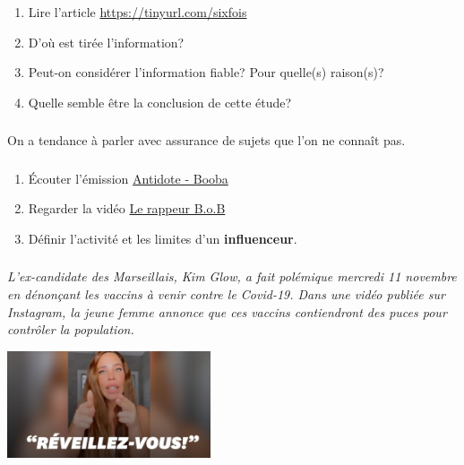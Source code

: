 \documentclass[svgnames,11pt]{beamer}
\begin{document}
\begin{frame}
    \frametitle{}

    \begin{activite}
        \begin{enumerate}
            \item Lire l'article \url{https://tinyurl.com/sixfois}
            \item D'où est tirée l'information?
            \item Peut-on considérer l'information fiable? Pour quelle(s) raison(s)?
            \item Quelle semble être la conclusion de cette étude?
        \end{enumerate}
        \end{activite}

\end{frame}
\begin{frame}
    \frametitle{}

    \begin{aretenir}[Biais 3]
    \centering On a tendance à parler avec assurance de sujets que l'on ne connaît pas.
    \end{aretenir}
\end{frame}
\begin{frame}
    \frametitle{}
\begin{activite}
\begin{enumerate}
    \item Écouter l'émission \href{https://www.franceinter.fr/embed/player/aod/8d4e5c50-df6a-4189-a4a3-3453bf875477}{Antidote - Booba}
    \item Regarder la vidéo \href{https://www.sciencesetavenir.fr/videos/le-rappeur-qui-croyait-que-la-terre-etait-plate-a-definitivement-perdu-la-partie_l3vzx8}{Le rappeur B.o.B}
    \item Définir l'activité et les limites d'un \textbf{influenceur}.
\end{enumerate}
\end{activite}
    

\end{frame}
\begin{frame}
    \frametitle{}

    \begin{aretenir}
    \centering \emph{L'ex-candidate des Marseillais, Kim Glow, a fait polémique mercredi 11 novembre en dénonçant les vaccins à venir contre le Covid-19. Dans une vidéo publiée sur Instagram, la jeune femme annonce que ces vaccins contiendront des puces pour contrôler la population. }
    \end{aretenir}
\begin{center}
\centering
\includegraphics[width=6cm]{ressources/kimglow.jpeg}
\end{center}
\end{frame}
\end{document}
